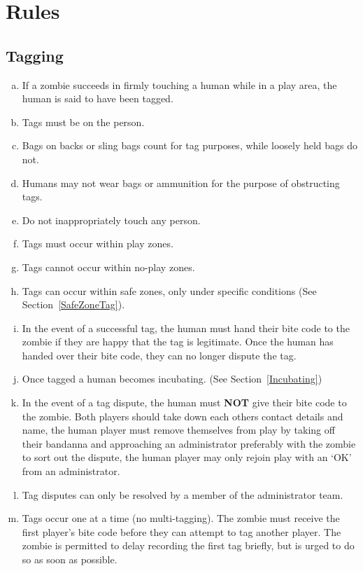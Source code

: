 \documentclass[a4paper,12pt]{article}
\begin{document}
\section{Rules}

\subsection{Tagging}

\begin{enumerate}[(a)]
    \item If a zombie succeeds in firmly touching a human while in a  play area, the human is said to have been tagged.
    \item Tags must be on the person.
    \item Bags on backs or sling bags count for tag purposes, while loosely held bags do not.
    \item Humans may not wear bags or ammunition for the purpose of obstructing tags.
    \item Do not inappropriately touch any person.
    \item Tags must occur within play zones.
    \item Tags cannot occur within no-play zones.
    \item Tags can occur within safe zones, only under specific conditions (See Section~\ref{SafeZoneTag}). 
    \item In the event of a successful tag, the human must hand their bite code to the zombie if they are happy that the tag is legitimate. Once the human has handed over their bite code, they can no longer dispute the tag.    
    \item Once tagged a human becomes incubating. (See Section~\ref{Incubating})
    \item In the event of a tag dispute, the human must {\bf NOT} give their bite code to the zombie. Both players should take down each others contact details and name, the human player must remove themselves from play by taking off their bandanna and approaching an administrator preferably with the zombie to sort out the dispute, the human player may only rejoin play with an `OK' from an administrator.
    \item Tag disputes can only be resolved by a member of the administrator team. 
    \item Tags occur one at a time (no multi-tagging). The zombie must receive the first player's bite code before they can attempt to tag another player. The zombie is permitted to delay recording the first tag briefly, but is urged to do so as soon as possible.
\end{enumerate}
\end{document}
